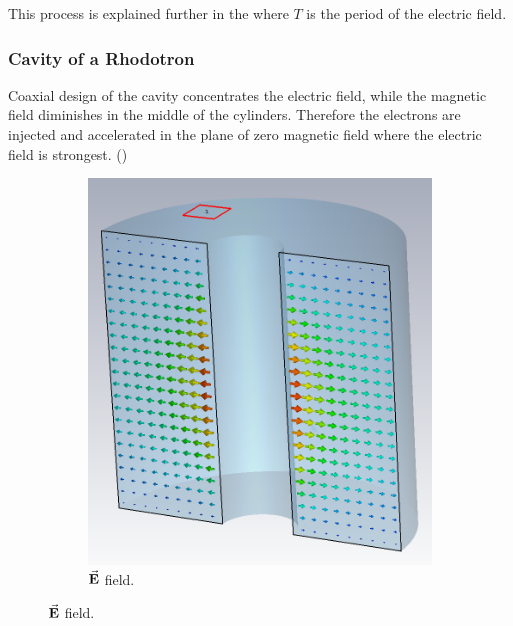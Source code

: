 \documentclass{article}
\begin{document}
This process is explained further in the  where $T$ is the period of the electric field.

\subsubsection{Cavity of a Rhodotron} \label{sec:cavity_of_a_rhodotron}

Coaxial design of the cavity concentrates the electric field, while the magnetic field diminishes in the middle of the cylinders. 
Therefore the electrons are injected and accelerated in the plane of zero magnetic field where the electric field is strongest. ()

\begin{figure}[H]
    \captionsetup[subfigure]{justification=centering}
    \captionsetup{justification=centering}
    \centering
    \begin{subfigure}{0.45\textwidth}
        \centering
        \includegraphics[width=\linewidth]{../../../figures/cst/cavity_E_field_dist.png}
        \caption*{$\vec{\textbf{E}}$ field.}
    \end{subfigure}

\end{figure}
\end{document}
